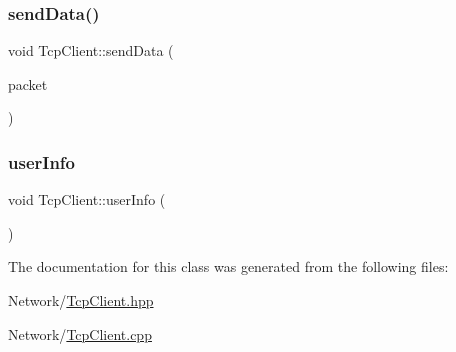 \mbox{\label{classTcpClient_a7603c7361ee647a8e154844279f5d908}} 
\subsubsection{\texorpdfstring{send\+Data()}{sendData()}}
{\footnotesize\ttfamily void Tcp\+Client\+::send\+Data (\begin{DoxyParamCaption}\item[{I\+Packet \&}]{packet }\end{DoxyParamCaption})}

\mbox{\label{classTcpClient_a04e4646cffdbf6842e57c92eced0324d}} 
\subsubsection{\texorpdfstring{user\+Info}{userInfo}}
{\footnotesize\ttfamily void Tcp\+Client\+::user\+Info (\begin{DoxyParamCaption}\item[{I\+Packet \&}]{ }\end{DoxyParamCaption})\hspace{0.3cm}{\ttfamily [signal]}}



The documentation for this class was generated from the following files\+:\begin{DoxyCompactItemize}
\item 
Network/\mbox{\hyperlink{TcpClient_8hpp}{Tcp\+Client.\+hpp}}\item 
Network/\mbox{\hyperlink{TcpClient_8cpp}{Tcp\+Client.\+cpp}}\end{DoxyCompactItemize}
